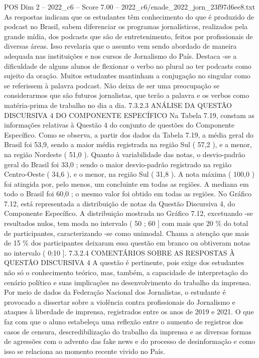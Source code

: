 \begin{textsample}{POS Dim 2 – 2022\_c6 – Score 7.00 – 2022\_c6/enade\_2022\_jorn\_23f97d6ee8.txt}
As respostas indicam que os estudantes têm conhecimento do que é produzido de podcast no Brasil, sabem diferenciar os programas jornalísticos, realizados pela grande mídia, dos podcasts que são de entretenimento, feitos por profissionais de diversas áreas.
Isso revelaria que o assunto vem sendo abordado de maneira adequada nas instituições e nos cursos de Jornalismo do País.
Destaca -se a dificuldade de alguns alunos de flexionar o verbo no plural ao ter podcasts como sujeito da oração.
Muitos estudantes mantinham a conjugação no singular como se referissem à palavra podcast.
Não deixa de ser uma preocupação se considerarmos que são futuros jornalistas, que terão a palavra e os verbos como matéria-prima de trabalho no dia a dia. 7.3.2.3 ANÁLISE DA QUESTÃO DISCURSIVA 4 DO COMPONENTE ESPECÍFICO Na Tabela 7.19, constam as informações relativas à Questão 4 do conjunto de questões do Componente Específico.
Como se observa, a partir dos dados da Tabela 7.19, a média geral do Brasil foi 53,9, sendo a maior média registrada na região Sul ( 57,2 ), e a menor, na região Nordeste ( 51,0 ).
Quanto à variabilidade das notas, o desvio-padrão geral do Brasil foi 33,0 ; sendo o maior desvio-padrão registrado na região Centro-Oeste ( 34,6 ), e o menor, na região Sul ( 31,8 ).
A nota máxima ( 100,0 ) foi atingida por, pelo menos, um concluinte em todas as regiões.
A mediana em todo o Brasil foi 60,0 ; o mesmo valor foi obtido em todas as regiões.
No Gráfico 7.12, está representada a distribuição de notas da Questão Discursiva 4, do Componente Específico.
A distribuição mostrada no Gráfico 7.12, excetuando -se resultados nulos, tem moda no intervalo ( 50 ; 60 ] com mais que 20 \% do total de participantes, caracterizando -se como unimodal.
Chama a atenção que mais de 15 \% dos participantes deixaram essa questão em branco ou obtiveram notas no intervalo ( 0:10 ]. 7.3.2.4 COMENTÁRIOS SOBRE AS RESPOSTAS À QUESTÃO DISCURSIVA 4 A questão é pertinente, pois exige dos estudantes não só o conhecimento teórico, mas, também, a capacidade de interpretação do cenário político e suas implicações no desenvolvimento do trabalho da imprensa.
Por meio de dados da Federação Nacional dos Jornalistas, o estudante é provocado a dissertar sobre a violência contra profissionais do Jornalismo e ataques à liberdade de imprensa, registrados entre os anos de 2019 e 2021.
O que faz com que o aluno estabeleça uma reflexão entre o aumento de registros dos casos de censura, descredibilização do trabalho da imprensa e as diversas formas de agressões com o advento das fake news e do processo de desinformação e como isso se relaciona ao momento recente vivido no País.

\end{textsample}
